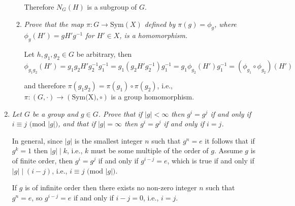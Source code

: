\documentclass[letterpaper, 11pt]{article}
\begin{document}
\begin{enumerate}
\begin{enumerate}
Therefore $N_G(H)$ is a subgroup of $G$.
\item \emph{Prove that the map $\pi: G \rightarrow \text{Sym}(X)$ defined by $\pi(g) = \phi_g$, where $\phi_g(H') = gH'g^{-1}$ for $H' \in X$, is a homomorphism.}

Let $h, g_1, g_2 \in G$ be arbitrary, then
\[
\phi_{g_1g_2}(H') = g_1g_2H'g_2^{-1}g_1^{-1} = g_1(g_2H'g_2^{-1})g_1^{-1} = g_1\phi_{g_2}(H')g_1^{-1} = (\phi_{g_1} \circ \phi_{g_2})(H')
\]

and therefore $\pi(g_1g_2) = \pi(g_1) \circ \pi(g_2)$, i.e., $\pi: (G, \cdot) \rightarrow (\text{Sym(X)}, \circ)$ is a group homomorphism.
\end{enumerate}

\item \emph{Let $G$ be a group and $g \in G$.  Prove that if $|g| < \infty$ then $g^i = g^j$ if and only if $i \equiv j \mbox{ (mod $|g|$)}$, and that if $|g| = \infty$ then $g^i = g^j$ if and only if $i=j$.}

In general, since $|g|$ is the smallest integer $n$ such that $g^n = e$ it follows that if $g^k = 1$ then $|g| \mid k$, i.e., $k$ must be some multiple of the order of $g$.  Assume $g$ is of finite order, then $g^i = g^j$ if and only if $g^{i-j} = e$, which is true if and only if $|g| \mid (i-j)$, i.e., $i \equiv j \mbox{ (mod $|g|$)}$.

If $g$ is of infinite order then there exists no non-zero integer $n$ such that $g^n = e$, so $g^{i-j} = e$ if and only if $i-j = 0$, i.e., $i = j$.

\end{enumerate}
\end{document}
